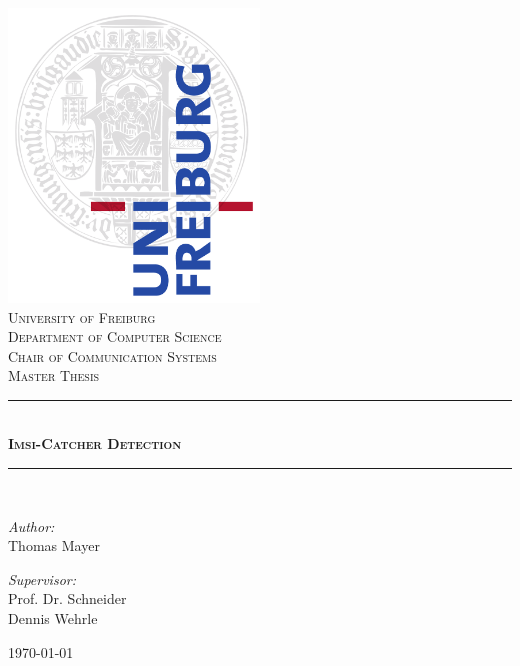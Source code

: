 
\begin{fullsizetitle}
	\thispagestyle{empty}
	\begin{center}
		\includegraphics[width=0.5\textwidth]{../Images/unisiegel}\\[1cm]

		\textsc{\LARGE University of Freiburg}\\[0.5cm]
		\textsc{Department of Computer Science\\Chair of Communication Systems}\\[2cm]
		\textsc{\LARGE Master Thesis}\\[0.5cm]

		\rule{0.7\linewidth}{0.5mm} \\[0.7cm]
		\textsc{\huge \bfseries Imsi-Catcher Detection}\\[0.4cm]
		\rule{0.7\linewidth}{0.5mm} \\[1.5cm]

		\begin{minipage}{0.4\textwidth}
			\begin{flushleft} \large
				\emph{Author:}\\
				Thomas Mayer
			\end{flushleft}
		\end{minipage}
		\begin{minipage}{0.4\textwidth}
			\begin{flushright} \large
				\emph{Supervisor:} \\
				Prof. Dr. Schneider\\
				Dennis Wehrle
			\end{flushright}
		\end{minipage}

		\vfill
		{\large \today}
	\end{center}
\end{fullsizetitle}